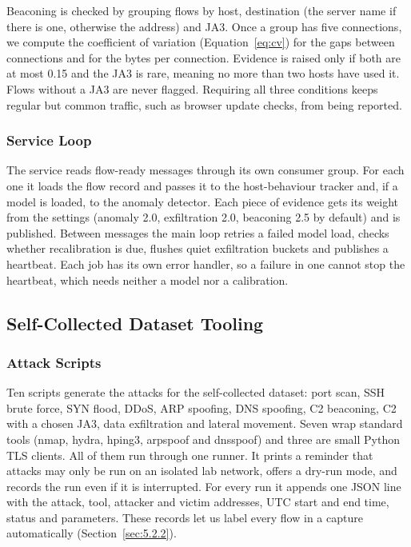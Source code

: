 \noindent Beaconing is checked by grouping flows by host, destination (the server name if there is one, otherwise the address) and JA3. Once a group has five connections, we compute the coefficient of variation (Equation~\ref{eq:cv}) for the gaps between connections and for the bytes per connection. Evidence is raised only if both are at most 0.15 and the JA3 is rare, meaning no more than two hosts have used it. Flows without a JA3 are never flagged. Requiring all three conditions keeps regular but common traffic, such as browser update checks, from being reported.

\subsubsection{Service Loop}\label{sec:7.1.7.3}

\noindent The service reads flow-ready messages through its own consumer group. For each one it loads the flow record and passes it to the host-behaviour tracker and, if a model is loaded, to the anomaly detector. Each piece of evidence gets its weight from the settings (anomaly 2.0, exfiltration 2.0, beaconing 2.5 by default) and is published. Between messages the main loop retries a failed model load, checks whether recalibration is due, flushes quiet exfiltration buckets and publishes a heartbeat. Each job has its own error handler, so a failure in one cannot stop the heartbeat, which needs neither a model nor a calibration.

\subsection{Self-Collected Dataset Tooling}\label{sec:7.1.8}

\subsubsection{Attack Scripts}\label{sec:7.1.8.1}

\noindent Ten scripts generate the attacks for the self-collected dataset: port scan, SSH brute force, SYN flood, DDoS, ARP spoofing, DNS spoofing, C2 beaconing, C2 with a chosen JA3, data exfiltration and lateral movement. Seven wrap standard tools (nmap, hydra, hping3, arpspoof and dnsspoof) and three are small Python TLS clients. All of them run through one runner. It prints a reminder that attacks may only be run on an isolated lab network, offers a dry-run mode, and records the run even if it is interrupted. For every run it appends one JSON line with the attack, tool, attacker and victim addresses, UTC start and end time, status and parameters. These records let us label every flow in a capture automatically (Section~\ref{sec:5.2.2}).

